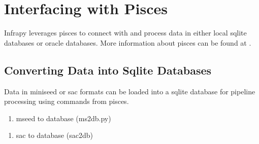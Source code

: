 \documentclass[letterpaper,10pt,english]{sphinxmanual}
\begin{document}
\begin{sphinxVerbatim}[commandchars=\\\{\}]
  
\end{sphinxVerbatim}


\section{Interfacing with Pisces}
\label{\detokenize{pisces:interfacing-with-pisces}}\label{\detokenize{pisces:pisces}}\label{\detokenize{pisces::doc}}
Infrapy leverages pisces to connect with and process data in either local sqlite databases or oracle databases. More information about pisces can be found at .


\subsection{Converting Data into Sqlite Databases}
\label{\detokenize{pisces:converting-data-into-sqlite-databases}}
Data in miniseed or sac formats can be loaded into a sqlite database for pipeline processing using commands from pisces.
\begin{enumerate}
\def\theenumi{\arabic{enumi}}
\def\labelenumi{\theenumi .}
\makeatletter\def\p@enumii{\p@enumi \theenumi .}\makeatother
\item {} 
mseed to database (ms2db.py)

\end{enumerate}

\begin{sphinxVerbatim}[commandchars=\\\{\}]
   
\end{sphinxVerbatim}
\begin{enumerate}
\def\theenumi{\arabic{enumi}}
\def\labelenumi{\theenumi .}
\makeatletter\def\p@enumii{\p@enumi \theenumi .}\makeatother
\setcounter{enumi}{1}
\item {} 
sac to database (sac2db)

\end{enumerate}

\begin{sphinxVerbatim}[commandchars=\\\{\}]
    
\end{sphinxVerbatim}
\end{document}
